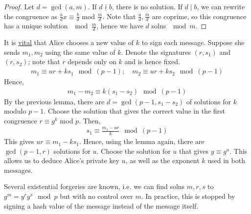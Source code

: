 \begin{proof}
    Let $d = \gcd(a,m)$.
    If $d \nmid b$, there is no solution.
    If $d \mid b$, we can rewrite the congruence as $\frac{a}{d} x \equiv \frac{b}{d}$ mod $\frac{m}{d}$.
    Note that $\frac{a}{d}, \frac{m}{d}$ are coprime, so this congruence has a unique solution $\mod \frac{m}{d}$, hence we have $d$ solns $\mod m$.
\end{proof}

It is \underline{vital} that Alice chooses a new value of $k$ to sign each message.
Suppose she sends $m_1, m_2$ using the same value of $k$.
Denote the signatures $(r, s_1)$ and $(r, s_2)$; note that $r$ depends only on $k$ and is hence fixed.
\begin{align*}
    m_1 \equiv ur + ks_1 \mod (p-1);\quad m_2 \equiv ur + ks_2 \mod (p-1)
\end{align*}
Hence,
\begin{align*}
    m_1 - m_2 \equiv k(s_1 - s_2) \mod (p-1)
\end{align*}
By the previous lemma, there are $d = \gcd(p-1, s_1 - s_2)$ of solutions for $k$ modulo $p-1$.
Choose the solution that gives the correct value in the first congruence $r \equiv g^k$ mod $p$.
Then,
\begin{align*}
    s_1 \equiv \frac{m_1 - ur}{k} \mod (p-1)
\end{align*}
This gives $ur \equiv m_1 - ks_1$.
Hence, using the lemma again, there are $\gcd(p-1, r)$ solutions for $u$.
Choose the solution for $u$ that gives $y \equiv g^u$.
This allows us to deduce Alice's private key $u$, as well as the exponent $k$ used in both messages.

\begin{remark}
    Several existential forgeries are known, i.e. we can find solns $m, r, s$ to $g^m = y^r y^s \mod p$ but with no control over $m$.
    In practice, this is stopped by signing a hash value of the message instead of the message itself.
\end{remark}

